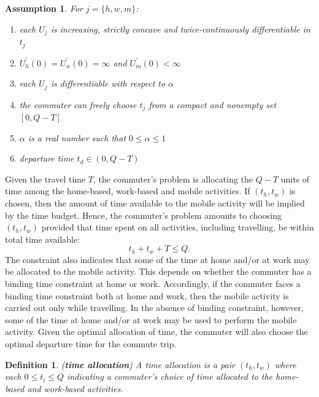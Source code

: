 \documentclass[12pt,a4paper,british]{article}
\newtheorem{definition}{Definition}[section]
\newtheorem{assumption}{Assumption}[section]
\begin{document}
\begin{assumption}
    For $j=\{h,w,m\}$: 
    \begin{enumerate}
        \item each $U_j$ is increasing, strictly concave and twice-continuously differentiable in $t_j$
        \item $U_{h}^{\prime}\left(0\right) = U_{w}^{\prime}\left(0\right) = \infty$ and $U_{m}^{\prime}\left(0\right)<\infty$
        \item each $U_j$ is differentiable with respect to $\alpha$
        \item the commuter can freely choose $t_j$ from a compact and nonempty set $[0, Q-T]$
        \item $\alpha$ is a real number such that $0 \leq \alpha \leq 1$
        \item departure time $t_d \in (0, Q-T)$
    \end{enumerate}
\end{assumption}

Given the travel time $T$, the commuter's problem is allocating the $Q-T$ units of time among the home-based, work-based and mobile activities. If $\left(t_{h},t_{w}\right)$ is chosen, then the amount of time available to the mobile activity will be implied by the time budget. Hence, the commuter's problem amounts to choosing $\left(t_{h},t_{w}\right)$ provided that time spent on all activities, including travelling, be within total time available:  
\begin{equation}
t_{h}+t_{w}+T\leq Q.
\label{constraint0}
\end{equation}
The constraint also indicates that some of the time at home and/or at work may be allocated to the mobile activity. This depends on whether the commuter has a binding time constraint at home or work. Accordingly, if the commuter faces a binding time constraint both at home and work, then the mobile activity is carried out only while travelling. In the absence of binding constraint, however, some of the time at home and/or at work may be used to perform the mobile activity. Given the optimal allocation of time, the commuter will also choose the optimal departure time for the commute trip.


\begin{definition}
(\textbf{time allocation}) A time allocation is a pair $\left(t_{h},t_{w}\right)$ where each $0\leq t_{i}\leq Q$ indicating a commuter's choice of time allocated to the home-based and work-based activities.
\end{definition}
\end{document}
